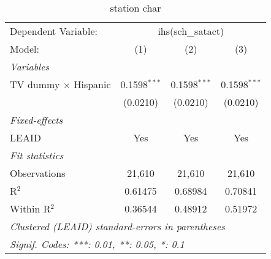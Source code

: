 \begin{table}[htbp]
\centering
\caption{station char}
\begin{tabular}{lccc}
\tabularnewline\midrule\midrule
Dependent Variable:&\multicolumn{3}{c}{ihs(sch\_satact)}\\
Model:&(1) & (2) & (3)\\
\midrule \emph{Variables}&   &   &  \\
TV dummy $\times$ Hispanic & 0.1598$^{***}$ & 0.1598$^{***}$ & 0.1598$^{***}$\\
  &(0.0210) & (0.0210) & (0.0210)\\
\midrule \emph{Fixed-effects}&   &   &  \\
LEAID & Yes & Yes & Yes\\
\midrule \emph{Fit statistics}&  & & \\
Observations & 21,610&21,610&21,610\\
R$^2$ & 0.61475&0.68984&0.70841\\
Within R$^2$ & 0.36544&0.48912&0.51972\\
\midrule\midrule\multicolumn{4}{l}{\emph{Clustered (LEAID) standard-errors in parentheses}}\\
\multicolumn{4}{l}{\emph{Signif. Codes: ***: 0.01, **: 0.05, *: 0.1}}\\
\end{tabular}
\end{table}

